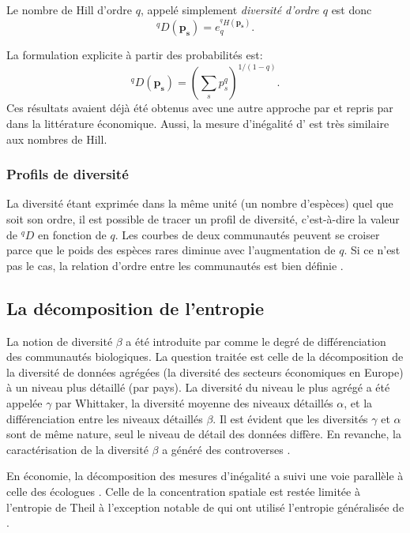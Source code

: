 \documentclass[fleqn,10pt]{ArtEcoFoG} %
\begin{document}
Le nombre de Hill d'ordre \(q\), appelé simplement \emph{diversité
d'ordre \(q\)} \citep{Jost2006} est donc
\[^{q}D(\mathbf{p_s}) = e_q^{^{q}H(\mathbf{p_s})}.\]

La formulation explicite à partir des probabilités est:
\[^{q}D(\mathbf{p_s}) = \left( \sum_{s}{p^q_s} \right)^{1/(1-q)}.\] Ces
résultats avaient déjà été obtenus avec une autre approche par
\citet{MacArthur1965} et repris par \citet{Adelman1969} dans la
littérature économique. Aussi, la mesure d'inégalité
d'\citet{Atkinson1970} est très similaire aux nombres de Hill.

\subsubsection{Profils de diversité}\label{profils-de-diversite}

La diversité étant exprimée dans la même unité (un nombre d'espèces)
quel que soit son ordre, il est possible de tracer un profil de
diversité, c'est-à-dire la valeur de \(^{q}D\) en fonction de \(q\). Les
courbes de deux communautés peuvent se croiser parce que le poids des
espèces rares diminue avec l'augmentation de \(q\). Si ce n'est pas le
cas, la relation d'ordre entre les communautés est bien définie
\citep{Tothmeresz1995}.

\subsection{La décomposition de
l'entropie}\label{la-decomposition-de-lentropie}

La notion de diversité \(\beta\) a été introduite par
\citet{Whittaker1960} comme le degré de différenciation des communautés
biologiques. La question traitée est celle de la décomposition de la
diversité de données agrégées (la diversité des secteurs économiques en
Europe) à un niveau plus détaillé (par pays). La diversité du niveau le
plus agrégé a été appelée \(\gamma\) par Whittaker, la diversité moyenne
des niveaux détaillés \(\alpha\), et la différenciation entre les
niveaux détaillés \(\beta\). Il est évident que les diversités
\(\gamma\) et \(\alpha\) sont de même nature, seul le niveau de détail
des données diffère. En revanche, la caractérisation de la diversité
\(\beta\) a généré des controverses \citep{Ellison2010a}.

En économie, la décomposition des mesures d'inégalité a suivi une voie
parallèle à celle des écologues \citep{Bourguignon1979}. Celle de la
concentration spatiale est restée limitée à l'entropie de Theil
\citep{Mori2005, Cutrini2010} à l'exception notable de
\citet{Brulhart2005} qui ont utilisé l'entropie généralisée de
\citet{Shorrocks1980}.
\end{document}
